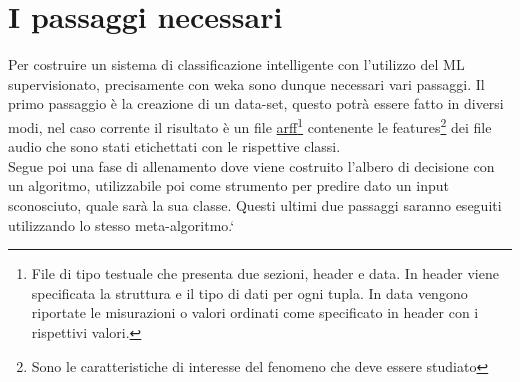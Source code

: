 \section{I passaggi necessari}
Per costruire un sistema di classificazione intelligente con l'utilizzo del ML supervisionato, precisamente con weka sono dunque necessari vari passaggi. Il primo passaggio è la creazione di un data-set, questo potrà essere fatto in diversi modi, nel caso corrente il risultato è un file \href{https://www.cs.waikato.ac.nz/ml/weka/arff.html}{arff}\footnote{File di tipo testuale che presenta due sezioni, header e data. In header viene specificata la struttura e il tipo di dati per ogni tupla. In data vengono riportate le misurazioni o valori ordinati come specificato in header con i rispettivi valori.} contenente le features\footnote{Sono le caratteristiche di interesse del fenomeno che deve essere studiato} dei file audio che sono stati etichettati con le rispettive classi.\\
Segue poi una fase di allenamento dove viene costruito l'albero di decisione con un algoritmo, utilizzabile poi come strumento per predire dato un input sconosciuto, quale sarà la sua classe. Questi ultimi due passaggi saranno eseguiti utilizzando lo stesso meta-algoritmo.`
